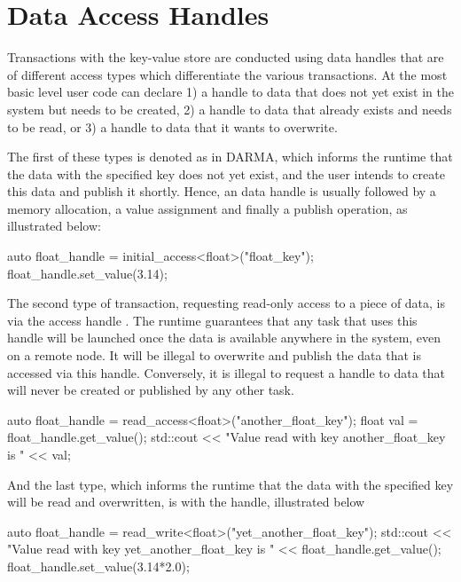 \section{Data Access Handles}
\label{sec:handles}

Transactions with the \gls{key-value store} are conducted using data handles that are of different access types which differentiate the 
various transactions. At the most basic level user code can declare 1) a handle to data that does not yet exist in the system
but needs to be created, 2) a handle to data that already exists and needs to
be read, or 3) a handle to data that it wants to overwrite. 

The first of these types is denoted as  in DARMA, which informs the runtime that the data with the 
specified key does not yet exist, and the user intends to create this data and publish it shortly. Hence, an 
data handle is usually followed by a memory allocation, a value assignment and finally a publish operation, as illustrated below: 
\begin{CppCode}
auto float_handle = initial_access<float>("float_key");
float_handle.set_value(3.14);
\end{CppCode}


The second type of transaction, requesting read-only access to a piece of data, is via the access handle . The runtime
guarantees that any task that uses this handle will be launched once the data is available anywhere in the system, even on a remote node.
It will be illegal to overwrite and publish the data that is accessed via this handle. Conversely, it is illegal to request a 
handle to data that will never be created or published by any other task.
\begin{CppCode}
auto float_handle = read_access<float>("another_float_key");
float val = float_handle.get_value();
std::cout << "Value read with key another_float_key is " << val;
\end{CppCode}

And the last type, which informs the runtime that the data with the specified key will be read and overwritten, is with the 
handle, illustrated below
\begin{CppCode}
auto float_handle = read_write<float>("yet_another_float_key");
std::cout << "Value read with key yet_another_float_key is " 
          << float_handle.get_value();
float_handle.set_value(3.14*2.0);
\end{CppCode}

